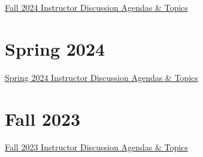 \documentclass[
  letterpaper,
  DIV=11,
  numbers=noendperiod]{scrreprt}
\begin{document}
\href{https://docs.google.com/document/d/1d4uNQmo_m6-1macCfkGdmlWP_1Z1T8CoJOpRosap17w/edit?usp=sharing}{Fall
2024 Instructor Discussion Agendas \& Topics}

\section{Spring 2024}\label{spring-2024}

\href{https://docs.google.com/document/d/1eyNGD3cgrksM8mMTiXkDDqPpbQzYD_nBHx9GlixoDVM/edit?usp=sharing}{Spring
2024 Instructor Discussion Agendas \& Topics}

\section{Fall 2023}\label{fall-2023}

\href{https://docs.google.com/document/d/1Q_QcuQYQq2zpa6WMIYnB7TajFqMtxD8W2Eht7Zb3PRU/edit?usp=sharing}{Fall
2023 Instructor Discussion Agendas \& Topics}
\end{document}
